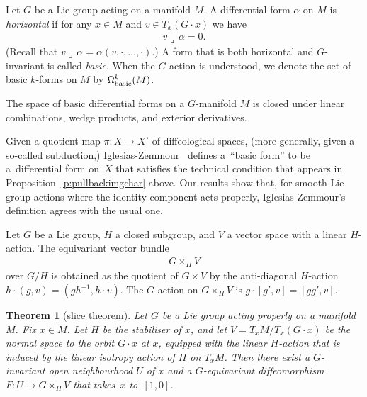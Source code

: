 \documentclass[pdftex]{sigma}
\numberwithin{equation}{section}
\newtheorem{Theorem}{Theorem}[section]
\newcommand{\hook}{{\lrcorner\,}} %
\begin{document}
\begin{Definition} \label{d:basic form}
Let $G$ be a Lie group acting on a manifold $M$.
A dif\/ferential form $\alpha$ on $M$ is \emph{horizontal}
if for any $x \in M$ and $v \in T_x(G\cdot x)$ we have
\begin{gather*} v \hook \alpha = 0.\end{gather*}
(Recall that $v\hook\alpha=\alpha(v,\cdot,\dots,\cdot)$.)
A form that is both horizontal and $G$-invariant is called \emph{basic}.
When the $G$-action is understood,
we denote the set of basic $k$-forms on $M$ by $\Omega^k_{\rm basic}(M)$.
\end{Definition}

\begin{Remark} \label{r:wedge and d of basic}
The space of basic dif\/ferential forms on a $G$-manifold $M$
is closed under linear combinations, wedge products,
and exterior derivatives.
\end{Remark}

\begin{Remark}
Given a quotient map $\pi \colon X \to X'$ of dif\/feological spaces,
(more generally, given a so-called subduction,)
Iglesias-Zemmour~\cite[Section~6.38]{iglesias}
def\/ines a~``basic form'' to be a~dif\/ferential form on~$X$
that satisf\/ies the technical condition that appears in
Proposition~\ref{p:pullbackimgchar} above.
Our results show that, for smooth Lie group actions
where the identity component acts properly,
Iglesias-Zemmour's def\/inition agrees with the usual one.
\end{Remark}

Let $G$ be a Lie group, $H$ a closed subgroup, and $V$ a vector space
with a linear $H$-action. The equivariant vector bundle
\begin{gather*} G \times_H V \end{gather*}
over $G/H$ is obtained as the quotient of $G \times V$
by the anti-diagonal $H$-action $h \cdot (g,v) = (g h^{-1} , h \cdot v)$.
The $G$-action on $G\times_H V$ is $g\cdot[g',v]=[gg',v]$.

\begin{Theorem}[slice theorem]
\label{t:slice theorem}
Let $G$ be a Lie group acting properly on a manifold $M$. Fix $x\in M$.
Let $H$ be the stabiliser of $x$, and let $V = T_x M / T_x(G\cdot x)$
be the normal space to the orbit $G\cdot x$ at $x$,
equipped with the linear $H$-action that is induced
by the linear isotropy action of $H$ on $T_xM$.
Then there exist a $G$-invariant open neighbourhood $U$ of $x$
and a $G$-equivariant diffeomorphism $F\colon U\to G\times_H V$
that takes~$x$ to~$[1,0]$.
\end{Theorem}
\end{document}
